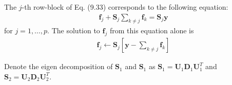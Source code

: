 \begin{exercise}
  \begin{exerciseSection}
    The $j$-th row-block of Eq. (9.33) corresponds to the following equation:
    \begin{align}
      \mathbf{f}_j + \mathbf{S}_j\sum_{k\not=j}\mathbf{f}_k =  \mathbf{S}_j
      \mathbf{y}
    \end{align}
    for $j=1,\ldots,p$. The solution to $\mathbf{f}_j$ from this equation alone
    is
    \begin{align}
      \mathbf{f}_j\leftarrow \mathbf{S}_j\left[\mathbf{y} -
      \sum_{k\not=j}\mathbf{f}_k\right]
    \end{align}
  \end{exerciseSection}
  
  \begin{exerciseSection}
    Denote the eigen decomposition of $\mathbf{S}_1$ and $\mathbf{S}_1$ as
    $\mathbf{S}_1 = \mathbf{U}_1\mathbf{D}_1\mathbf{U}_1^T$ and $\mathbf{S}_2 =
    \mathbf{U}_2\mathbf{D}_2\mathbf{U}_2^T$.
    

\end{exerciseSection}
\end{exercise}

